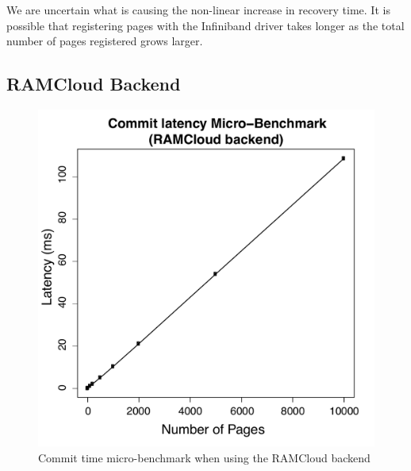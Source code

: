 We are uncertain what is causing the non-linear increase in recovery time.
It is possible that registering pages with the Infiniband driver takes
longer as the total number of pages registered grows larger.

\subsection{RAMCloud Backend}
\begin{figure}[t!]
\begin{center}
\includegraphics[scale=0.40]{graphs/commit_time_rc_latencies.pdf}
\end{center}
\caption{Commit time micro-benchmark when using the RAMCloud backend}
\label{fig:rc-commit-ubm}
\end{figure}

